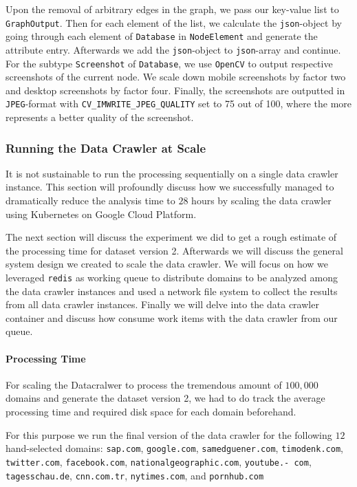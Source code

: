 Upon the removal of arbitrary edges in the graph, we pass our key-value list to \texttt{GraphOutput}. Then for each element of the list, we calculate the \texttt{json}-object by going through each element of \texttt{Database} in \texttt{NodeElement} and generate the attribute entry. Afterwards we add the \texttt{json}-object to \texttt{json}-array and continue. For the subtype \texttt{Screenshot} of \texttt{Database}, we use \texttt{OpenCV} to output respective screenshots of the current node. We scale down mobile screenshots by factor two and desktop screenshots by factor four. Finally, the screenshots are outputted in \texttt{JPEG}-format with \texttt{CV\_IMWRITE\_JPEG\_QUALITY} set to 75 out of 100, where the more represents a better quality of the screenshot. 

\subsubsection{Running the Data Crawler at Scale}
\label{datacrawler_scale}
It is not sustainable to run the processing sequentially on a single data crawler instance. This section will profoundly discuss how we successfully managed to dramatically reduce the analysis time to $28$ hours by scaling the data crawler using Kubernetes on Google Cloud Platform. 

The next section will discuss the experiment we did to get a rough estimate of the processing time for dataset version 2. Afterwards we will discuss the general system design we created to scale the data crawler. We will focus on how we leveraged \texttt{redis} as working queue to distribute domains to be analyzed among the data crawler instances and used a network file system to collect the results from all data crawler instances. Finally we will delve into the data crawler container and discuss how consume work items with the data crawler from our queue.

\paragraph*{Processing Time}
\label{datacrawler_processing_time}
For scaling the Datacralwer to process the tremendous amount of $100,000$ domains and generate the dataset version 2, we had to do track the average processing time and required disk space for each domain beforehand.

For this purpose we run the final version of the data crawler for the following $12$ hand-selected domains: \texttt{sap.com}, \texttt{google.com}, \texttt{samedguener.com}, \texttt{timodenk.com}, \texttt{twitter.com}, \texttt{facebook.com}, \texttt{nationalgeographic.com}, \texttt{youtube.-
com}, \texttt{tagesschau.de}, \texttt{cnn.com.tr}, \texttt{nytimes.com}, and \texttt{pornhub.com}

